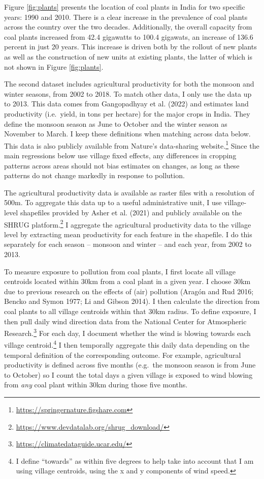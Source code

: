 \documentclass[
]{article}
\begin{document}
Figure \ref{fig:plants} presents the location of coal plants in India for two specific years: 1990 and 2010. There is a clear increase in the prevalence of coal plants across the country over the two decades. Additionally, the overall capacity from coal plants increased from 42.4 gigawatts to 100.4 gigawats, an increase of 136.6 percent in just 20 years. This increase is driven both by the rollout of new plants as well as the construction of new units at existing plants, the latter of which is not shown in Figure \ref{fig:plants}.

The second dataset includes agricultural productivity for both the monsoon and winter seasons, from 2002 to 2018. To match other data, I only use the data up to 2013. This data comes from Gangopadhyay et al. (2022) and estimates land productivity (i.e.~yield, in tons per hectare) for the major crops in India. They define the monsoon season as June to October and the winter season as November to March. I keep these definitions when matching across data below. This data is also publicly available from Nature's data-sharing website.\footnote{\url{https://springernature.figshare.com}} Since the main regressions below use village fixed effects, any differences in cropping patterns across areas should not bias estimates on changes, as long as these patterns do not change markedly in response to pollution.

The agricultural productivity data is available as raster files with a resolution of 500m. To aggregate this data up to a useful administrative unit, I use village-level shapefiles provided by Asher et al. (2021) and publicly available on the SHRUG platform.\footnote{\url{https://www.devdatalab.org/shrug_download/}} I aggregate the agricultural productivity data to the village level by extracting mean productivity for each feature in the shapefile. I do this separately for each season -- monsoon and winter -- and each year, from 2002 to 2013.

To measure exposure to pollution from coal plants, I first locate all village centroids located within 30km from a coal plant in a given year. I choose 30km due to previous research on the effects of (air) pollution (Aragón and Rud 2016; Bencko and Symon 1977; Li and Gibson 2014). I then calculate the direction from coal plants to all village centroids within that 30km radius. To define exposure, I then pull daily wind direction data from the National Center for Atmospheric Research.\footnote{\url{https://climatedataguide.ucar.edu/}} For each day, I document whether the wind is blowing towards each village centroid.\footnote{I define ``towards'' as within five degrees to help take into account that I am using village centroids, using the x and y components of wind speed.} I then temporally aggregate this daily data depending on the temporal definition of the corresponding outcome. For example, agricultural productivity is defined across five months (e.g.~the monsoon season is from June to October) so I count the total days a given village is exposed to wind blowing from \emph{any} coal plant within 30km during those five months.
\end{document}

